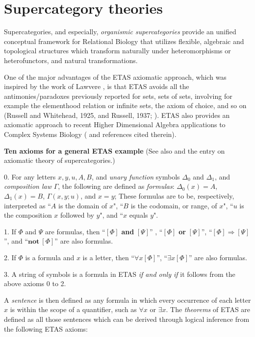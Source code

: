\documentclass[12pt]{article}
\theoremstyle{plain}
\theoremstyle{definition}
\numberwithin{equation}{section}
\begin{document}
\section{Supercategory theories}
Supercategories, and especially, {\em organismic supercategories} provide an unified conceptual framework for Relational Biology that utilizes flexible, algebraic and topological structures which transform naturally under heteromorphisms or heterofunctors, and natural transformations. 

One of the major advantages of the ETAS axiomatic approach, which was inspired by the work of 
Lawvere \cite{LW1, LW2}, is that ETAS avoids all the antimonies/paradoxes previously reported for sets,
sets of sets, involving for example the elementhood relation or infinite sets, the axiom of choice, and so on (Russell and Whitehead, 1925, and Russell, 1937; \cite{BBGG1}). ETAS also provides an axiomatic approach to recent Higher Dimensional Algebra applications to Complex Systems Biology (\cite{Bib14to34} and references cited therein).

\textbf{Ten axioms for a general ETAS example}
(See also \cite{LW2} and the entry on axiomatic theory of supercategories.)

0. For any letters $x, y, u, A, B$, and \emph{unary function} symbols $\Delta_0$ and $\Delta_1$,
and \emph{composition law} $\Gamma$, the following are defined as \emph{formulas}: $\Delta_0 (x) = A$,
$\Delta_1 (x) = B$, $\Gamma (x,y;u)$, and $ x = y$; These formulas are to be, respectively, interpreted as
``$A$ is the domain of $x$", ``$B$ is the codomain, or range, of $x$", ``$u$ is the composition $x$ followed by $y$",
and ``$x$ equals $y$". 

1. If $\Phi$ and $\Psi$ are formulas, then ``$[\Phi]$ \textbf{and} $[\Psi]$'' , ``$[\Phi]$ \textbf{or} $[\Psi]$'', ``$[\Phi] \Rightarrow [\Psi]$'', and ``$ \textbf{not} ~[\Phi]$''  are also formulas.

2. If $\Phi$ is a formula and $x$ is a letter, then ``$ \forall x[\Phi]$'', 
``$ \exists x[\Phi]$'' are also formulas.

3. A string of symbols is a formula in ETAS \emph{if and only if} it follows from the above axioms 0 to 2.

A \emph{sentence} is then defined as any formula in which every occurrence of each letter $x$ is within the scope of a quantifier, such as $\forall x$  or $\exists x $.  The \emph{theorems} of ETAS are defined as all those sentences which can be derived through logical inference from the following ETAS axioms:
\end{document}
